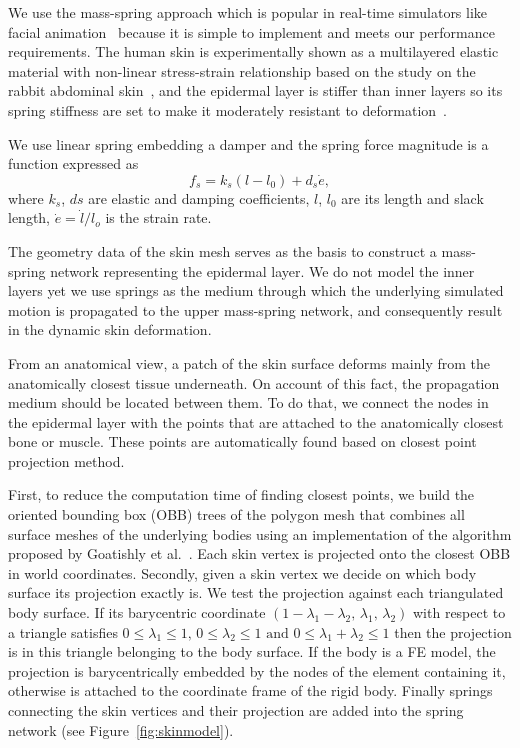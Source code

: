 We use the mass-spring approach which is popular in real-time simulators like facial animation~\cite{Fratarcangeli:2005:physically,Zhang:2004:NPM}
because it is simple to implement and meets our performance requirements. The human skin is experimentally shown as a multilayered elastic material with non-linear stress-strain relationship based on
the study on the rabbit abdominal skin~\cite{Fratarcangeli:2005:physically}, and the epidermal layer is stiffer than inner layers so its spring stiffness are set to make it moderately resistant to deformation~\cite{Zhang:2004:NPM}.

We use linear spring embedding a damper and the spring force magnitude is a function expressed as
\begin{equation}
f_{s} = k_{s}(l-l_{0})+d_{s}\dot{e},
\label{eq:spring}
\end{equation}
where $k_{s}$, $d{s}$ are elastic and damping coefficients, $l$, $l_{0}$ are its length and slack length, $\dot{e}=\dot{l}/l_{o}$ is the strain rate.

The geometry data of the skin mesh serves as the basis to construct a mass-spring network representing the epidermal layer. We do not model the inner layers yet we use springs as the medium through which the underlying simulated motion is propagated to the upper mass-spring network, and consequently result in the dynamic skin deformation.

From an anatomical view, a patch of the skin surface deforms mainly from the anatomically closest tissue underneath. On account of this fact, the propagation medium should be located between them. To do that, we connect the nodes in the epidermal layer with the points that are attached to the anatomically closest bone or muscle. These points are automatically found based on closest point projection method.

First, to reduce the computation time of finding closest points, we build the oriented bounding box (OBB) trees of the polygon mesh that combines all surface meshes of the underlying bodies using an implementation of the algorithm proposed by Goatishly et al.~\cite{Gottschalk:1996:OHS}. Each skin vertex is projected onto the closest OBB in world coordinates. Secondly, given a skin vertex we decide on which body surface its projection exactly is. We test the projection against each triangulated body surface. If its barycentric coordinate $\left(1- \lambda_{1} - \lambda_{2}\mbox{, }\lambda_{1}\mbox{, }\lambda_{2}\right)$ with respect to a triangle satisfies
$0\leq\lambda_{1}\leq1\mbox{, } 0\leq\lambda_{2}\leq1 \mbox{ and } 0\leq\lambda_{1}+\lambda_{2}\leq1$ then the projection is in this triangle belonging to the body surface. If the body is a FE model, the projection is barycentrically embedded by the nodes of the element containing it, otherwise is attached to the coordinate frame of the rigid body. Finally springs connecting the skin vertices and their
projection are added into the spring network (see Figure~\ref{fig:skinmodel}).


